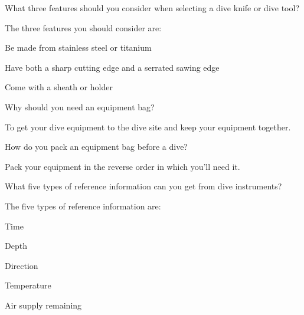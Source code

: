 	\begin{qanda}
		\begin{question}
What three features should you consider when selecting a dive knife or dive tool?
		\end{question}

		\begin{answer}
The three features you should consider are:
			\begin{nospacenumberedlist}
				\item Be made from stainless steel or titanium
				\item Have both a sharp cutting edge and a serrated sawing edge
				\item Come with a sheath or holder
			\end{nospacenumberedlist}
		\end{answer}
	\end{qanda}

	\begin{qanda}
		\begin{question}
Why should you need an equipment bag?
		\end{question}

		\begin{answer}
To get your dive equipment to the dive site and keep your equipment together.
		\end{answer}
	\end{qanda}

	\begin{qanda}
		\begin{question}
How do you pack an equipment bag before a dive?
		\end{question}

		\begin{answer}
Pack your equipment in the reverse order in which you'll need it.
		\end{answer}
	\end{qanda}

	\begin{qanda}
		\begin{question}
What five types of reference information can you get from dive instruments?
		\end{question}

		\begin{answer}
The five types of reference information are:
			\begin{nospacenumberedlist}
				\item Time
				\item Depth
				\item Direction
				\item Temperature
				\item Air supply remaining
			\end{nospacenumberedlist}
		\end{answer}
	\end{qanda}

